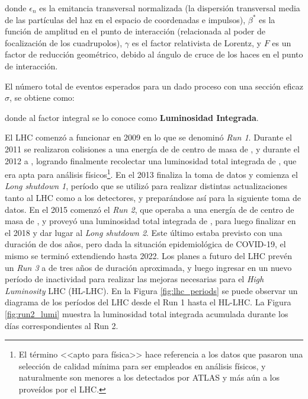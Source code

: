 donde $\epsilon_{n}$ es la emitancia transversal normalizada (la dispersión transversal media de las partículas del haz en el espacio de coordenadas e impulsos), $\beta^{*}$ es la función de amplitud en el punto de interacción (relacionada al poder de focalización de los cuadrupolos), $\gamma$ es el factor relativista de Lorentz, y $F$ es un factor de reducción geométrico, debido al ángulo de cruce de los haces en el punto de interacción.

El número total de eventos esperados para un dado proceso con una sección eficaz $\sigma$, se obtiene como:




donde al factor integral se lo conoce como \textbf{Luminosidad Integrada}.

El LHC comenzó a funcionar en 2009 en lo que se denominó \textit{Run 1}. Durante el 2011 se realizaron colisiones a una energía de de centro de masa de , y durante el 2012 a , logrando finalmente recolectar una luminosidad total integrada de  \cite{DAPR-2011-01,DAPR-2013-01}, que era apta para análisis físicos\footnote{El término <<apto para física>> hace referencia a los datos que pasaron una selección de calidad mínima para ser empleados en análisis físicos, y naturalmente son menores a los detectados por ATLAS y más aún a los proveídos por el LHC.}. En el 2013 finaliza la toma de datos y comienza el \textit{Long shutdown 1}, período que se utilizó para realizar distintas actualizaciones tanto al LHC como a los detectores, y preparándose así para la siguiente toma de datos. En el 2015 comenzó el \textit{Run 2}, que operaba a una energía de de centro de masa de , y proveyó una luminosidad total integrada de  \cite{lumi_13tev}, para luego finalizar en el 2018 y dar lugar al \textit{Long shutdown 2}. Este último estaba previsto con una duración de dos años, pero dada la situación epidemiológica de COVID-19, el mismo se terminó extendiendo hasta 2022.
Los planes a futuro del LHC prevén un \textit{Run 3} a  de tres años de duración aproximada, y luego ingresar en un nuevo período de inactividad para realizar las mejoras necesarias para el \textit{High Luminosity} LHC (HL-LHC). En la Figura \ref{fig:lhc_periods} se puede observar un diagrama de los períodos del LHC desde el Run 1 hasta el HL-LHC. La Figura \ref{fig:run2_lumi} muestra la luminosidad total integrada acumulada durante los días correspondientes al Run 2.


